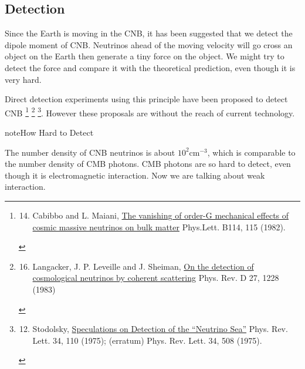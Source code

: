 \documentclass[letterpaper,12pt,english]{sphinxmanual}
\begin{document}
\subsection{Detection}
\label{cosmology:detection}
Since the Earth is moving in the CNB, it has been suggested that we detect the dipole moment of CNB. Neutrinos ahead of the moving velocity will go cross an object on the Earth then generate a tiny force on the object. We might try to detect the force and compare it with the theoretical prediction, even though it is very hard.

Direct detection experiments using this principle have been proposed to detect CNB \footnote{\begin{enumerate}
\setcounter{enumi}{13}
\item {} 
Cabibbo and L. Maiani, \href{http://www.sciencedirect.com/science/article/pii/0370269382901277}{The vanishing of order-G mechanical effects of cosmic massive neutrinos on bulk matter} Phys.Lett. B114, 115 (1982).

\end{enumerate}
} \footnote{\begin{enumerate}
\setcounter{enumi}{15}
\item {} 
Langacker, J. P. Leveille and J. Sheiman, \href{http://journals.aps.org/prd/abstract/10.1103/PhysRevD.27.1228}{On the detection of cosmological neutrinos by coherent scattering} Phys. Rev. D 27, 1228 (1983)

\end{enumerate}
} \footnote{\begin{enumerate}
\setcounter{enumi}{11}
\item {} 
Stodolsky, \href{http://journals.aps.org/prl/abstract/10.1103/PhysRevLett.34.110}{Speculations on Detection of the ``Neutrino Sea''} Phys. Rev. Lett. 34, 110 (1975); (erratum) Phys. Rev. Lett. 34, 508 (1975).

\end{enumerate}
}. However these proposals are without the reach of current technology. \footnotemark[1]

\begin{notice}{note}{How Hard to Detect}

The number density of CNB neutrinos is about \(10^2\mathrm{cm}^{-3}\), which is comparable to the number density of CMB photons. CMB photons are so hard to detect, even though it is electromagnetic interaction. Now we are talking about weak interaction.
\end{notice}
\end{document}

